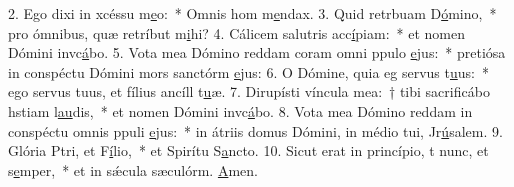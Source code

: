 2. Ego dixi in xcéssu m\uline{e}o:~* Omnis hom m\uline{e}ndax.
3. Quid retrbuam D\uline{ó}mino,~* pro ómnibus, quæ retríbut m\uline{i}hi?
4. Cálicem salutris acc\uline{í}piam:~* et nomen Dómini invc\uline{á}bo.
5. Vota mea Dómino reddam coram omni ppulo \uline{e}jus:~* pretiósa in conspéctu Dómini mors sanctórm \uline{e}jus:
6. O Dómine, quia eg servus t\uline{u}us:~* ego servus tuus, et fílius ancíll t\uline{u}æ.
7. Dirupísti víncula mea:~† tibi sacrificábo hstiam l\uline{au}dis,~* et nomen Dómini invc\uline{á}bo.
8. Vota mea Dómino reddam in conspéctu omnis ppuli \uline{e}jus:~* in átriis domus Dómini, in médio tui, Jr\uline{ú}salem.
9. Glória Ptri, et F\uline{í}lio,~* et Spirítu S\uline{a}ncto.
10. Sicut erat in princípio, t nunc, et s\uline{e}mper,~* et in sǽcula sæculórm. \uline{A}men.
